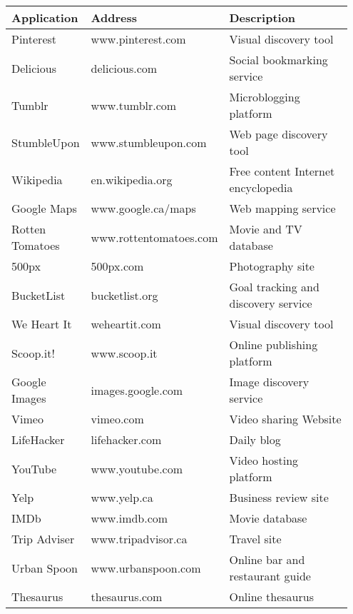 {\begin{table*}[htbp]
\begin{tabular}{|p{0.20\linewidth}| p{0.30\linewidth}| p{0.45\linewidth}|}
\hline
\textbf{Application} & \textbf{Address} & \textbf{Description}
\\
\hline
Pinterest       & www.pinterest.com 	& Visual discovery tool \\
\hline
Delicious       & delicious.com 		& Social bookmarking service \\
\hline
Tumblr          & www.tumblr.com 		& Microblogging platform \\
\hline
StumbleUpon     & www.stumbleupon.com  	& Web page discovery tool \\
\hline
Wikipedia       & en.wikipedia.org   	& Free content Internet encyclopedia\\
\hline
Google Maps     & www.google.ca/maps  	& Web mapping service\\
\hline
Rotten Tomatoes & www.rottentomatoes.com & Movie and TV database\\
\hline
500px           & 500px.com            	& Photography site\\
\hline
BucketList      & bucketlist.org  		& Goal tracking and discovery service\\
\hline
We Heart It     & weheartit.com 		& Visual discovery tool \\
\hline
Scoop.it!       & www.scoop.it 			& Online publishing platform \\
\hline
Google Images   & images.google.com  	& Image discovery service \\
\hline
Vimeo           & vimeo.com  			& Video sharing Website\\
\hline
LifeHacker      & lifehacker.com        & Daily blog \\
\hline
YouTube         & www.youtube.com 		& Video hosting platform \\
\hline
Yelp            & www.yelp.ca  			& Business review site\\
\hline
IMDb            & www.imdb.com  		& Movie database \\
\hline
Trip Adviser    & www.tripadvisor.ca 	& Travel site \\
\hline
Urban Spoon     & www.urbanspoon.com    & Online bar and restaurant guide\\
\hline
Thesaurus       & thesaurus.com         & Online thesaurus \\
\hline
\end{tabular}
\end{table*}
} %
\pagebreak
